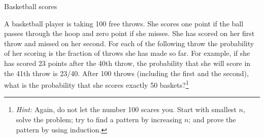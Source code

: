 \begin{problem}{Basketball scores}

A basketball player is taking 100 free throws. She scores one point if the ball passes through the hoop and zero point if she misses. She has scored on her first throw and missed on her second. For each of the following throw the probability of her scoring is the fraction of throws she has made so far. For example, if she has scored 23 points after the 40th throw, the probability that she will score in the 41th throw is 23/40. After 100 throws (including the first and the second), what is the probability that she scores exactly 50 baskets?\footnote[18]{\textit{Hint:} Again, do not let the number 100 scares you. Start with smallest \(n\), solve the problem; try to find a pattern by increasing \(n\); and prove the pattern by using induction.}

\end{problem}
